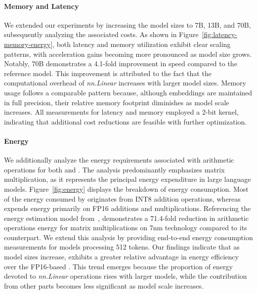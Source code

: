 \paragraph{Memory and Latency}

We extended our experiments by increasing the model sizes to 7B, 13B, and 70B, subsequently analyzing the associated costs. As shown in Figure~\ref{fig:latency-memory-energy}, both latency and memory utilization exhibit clear scaling patterns, with acceleration gains becoming more pronounced as model size grows. Notably,  70B demonstrates a 4.1-fold improvement in speed compared to the  reference model. This improvement is attributed to the fact that the computational overhead of \emph{nn.Linear} increases with larger model sizes. Memory usage follows a comparable pattern because, although embeddings are maintained in full precision, their relative memory footprint diminishes as model scale increases. All measurements for latency and memory employed a 2-bit kernel, indicating that additional cost reductions are feasible with further optimization.

\paragraph{Energy}

We additionally analyze the energy requirements associated with arithmetic operations for both  and . The analysis predominantly emphasizes matrix multiplication, as it represents the principal energy expenditure in large language models. Figure~\ref{fig:energy} displays the breakdown of energy consumption. Most of the energy consumed by  originates from INT8 addition operations, whereas  expends energy primarily on FP16 additions and multiplications. Referencing the energy estimation model from~\cite{energycost, pokebnn},  demonstrates a 71.4-fold reduction in arithmetic operations energy for matrix multiplications on 7nm technology compared to its counterpart. We extend this analysis by providing end-to-end energy consumption measurements for models processing 512 tokens. Our findings indicate that as model sizes increase,  exhibits a greater relative advantage in energy efficiency over the FP16-based . This trend emerges because the proportion of energy devoted to \emph{nn.Linear} operations rises with larger models, while the contribution from other parts becomes less significant as model scale increases.

